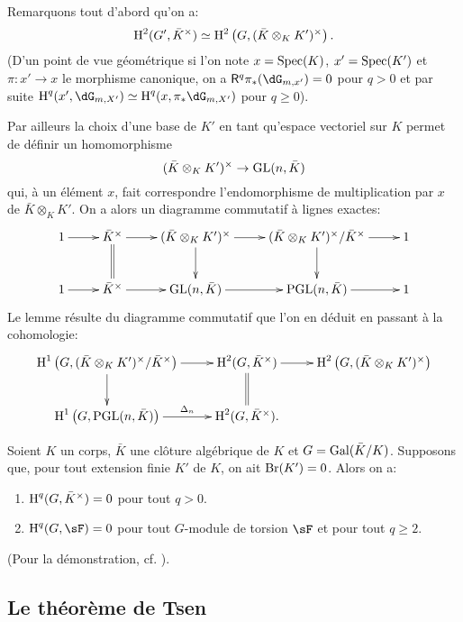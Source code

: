 Remarquons tout d'abord qu'on a: 
\[
  \operatorname{H}^2(G',\bar K^\times) \simeq \operatorname{H}^2\left(G,(\bar K\otimes_K K')^\times\right)\text{.}
\]
(D'un point de vue géométrique si l'on note $x=\operatorname{Spec}(K)$, $x'=\operatorname{Spec}(K')$ et 
$\pi:x'\to x$ le morphisme canonique, on a $\R^q \pi_*(\dG_{m,x'}) = 0$ pour 
$q>0$ et par suite $\h^q(x',\dG_{m,X'})\simeq \h^q(x,\pi_*\dG_{m,X'})$ pour 
$q\geqslant 0$). 

Par ailleurs la choix d'une base de $K'$ en tant qu'espace vectoriel sur $K$ 
permet de définir un homomorphisme 
\[
  (\bar K\otimes_K K')^\times \to \operatorname{GL}(n,\bar K)
\]
qui, à un élément $x$, fait correspondre l'endomorphisme de 
multiplication par $x$ de $\bar K\otimes_K K'$. On a alors un diagramme 
commutatif à lignes exactes: 
\[\xymatrix{
  1 \ar[r] 
    & \bar K^\times \ar[r] \ar@{=}[d]
    & (\bar K\otimes_K K')^\times \ar[r] \ar[d] 
    & (\bar K\otimes_K K')^\times / \bar K^\times \ar[r] \ar[d] 
    & 1 \\
  1 \ar[r] 
    & \bar K^\times \ar[r] 
    & \gl(n,\bar K) \ar[r] 
    & \pgl(n,\bar K) \ar[r] 
    & 1
}\]
Le lemme résulte du diagramme commutatif que l'on en déduit en passant 
à la cohomologie:
\[\xymatrix{
  \h^1\left(G,(\bar K\otimes_K K')^\times/\bar K^\times\right) \ar[r] \ar[d] 
    & \h^2(G,\bar K^\times) \ar[r] \ar@{=}[d]
    & \h^2\left(G,(\bar K\otimes_K K')^\times\right) \\
  \h^1\left(G,\pgl(n,\bar K)\right) \ar[r]^-{\Delta_n} 
    & \h^2(G,\bar K^\times) \text{.}
}\]





\begin{proposition}\label{I:3-1-6}
Soient $K$ un corps, $\bar K$ une clôture algébrique de $K$ et 
$G=\operatorname{Gal}(\bar K/K)$. Supposons que, pour tout extension finie $K'$ de $K$, on 
ait $\operatorname{Br}(K')=0$. Alors on a:
\begin{enumerate}[\indent i)]
  \item $\operatorname{H}^q(G,\bar K^\times) = 0$ pour tout $q>0$.
  \item $\h^q(G,\sF) = 0$ pour tout $G$-module de torsion $\sF$ et pour tout 
    $q\geqslant 2$.
\end{enumerate}
\end{proposition}

(Pour la démonstration, cf. \cite{se94}).










\subsection{Le théorème de Tsen}\label{I:3-2}





